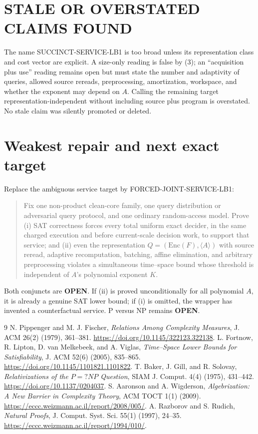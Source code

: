 \documentclass[11pt]{article}
\newcommand{\status}[1]{\textbf{#1}}
\begin{document}
\section{STALE OR OVERSTATED CLAIMS FOUND}
The name \textsf{SUCCINCT-SERVICE-LB1} is too broad unless its representation
class and cost vector are explicit.  A size-only reading is false by (3); an
``acquisition plus use'' reading remains open but must state the number and
adaptivity of queries, allowed source rereads, preprocessing, amortization,
workspace, and whether the exponent may depend on $A$.  Calling the remaining
target representation-independent without including source plus program is
overstated.  No stale claim was silently promoted or deleted.

\section{Weakest repair and next exact target}
Replace the ambiguous service target by
\textsf{FORCED-JOINT-SERVICE-LB1}:
\begin{quote}
Fix one non-product clean-core family, one query distribution or adversarial
query protocol, and one ordinary random-access model.  Prove (i) SAT
correctness forces every total uniform exact decider, in the same charged
execution and before current-scale decision work, to support that service;
and (ii) even the representation $Q=(\mathrm{Enc}(F),\langle A\rangle)$ with
source reread, adaptive recomputation, batching, affine elimination, and
arbitrary preprocessing violates a simultaneous time--space bound whose
threshold is independent of $A$'s polynomial exponent $K$.
\end{quote}
Both conjuncts are \status{OPEN}.  If (ii) is proved unconditionally for all
polynomial $A$, it is already a genuine SAT lower bound; if (i) is omitted,
the wrapper has invented a counterfactual service.  P versus NP remains
\status{OPEN}.

\begin{thebibliography}{9}
 N. Pippenger and M. J. Fischer,
\emph{Relations Among Complexity Measures}, J. ACM 26(2) (1979), 361--381.
\url{https://doi.org/10.1145/322123.322138}.
 L. Fortnow, R. Lipton, D. van Melkebeek, and A. Viglas,
\emph{Time--Space Lower Bounds for Satisfiability}, J. ACM 52(6) (2005),
835--865. \url{https://doi.org/10.1145/1101821.1101822}.
 T. Baker, J. Gill, and R. Solovay,
\emph{Relativizations of the $P=?NP$ Question}, SIAM J. Comput. 4(4) (1975),
431--442. \url{https://doi.org/10.1137/0204037}.
 S. Aaronson and A. Wigderson,
\emph{Algebrization: A New Barrier in Complexity Theory}, ACM TOCT 1(1)
(2009). \url{https://eccc.weizmann.ac.il/report/2008/005/}.
 A. Razborov and S. Rudich,
\emph{Natural Proofs}, J. Comput. Syst. Sci. 55(1) (1997), 24--35.
\url{https://eccc.weizmann.ac.il/report/1994/010/}.
\end{thebibliography}
\end{document}
